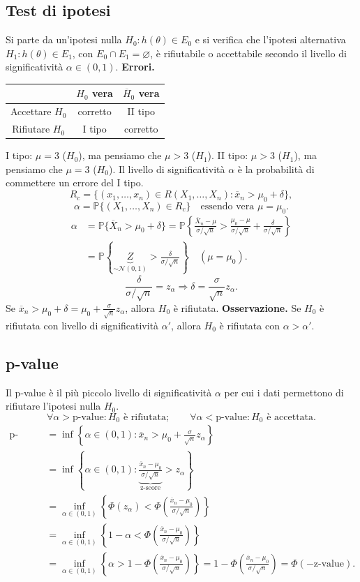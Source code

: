 \subsection*{Test di ipotesi}
Si parte da un'ipotesi nulla $H_0:h(\theta)\in E_0$ e si verifica che l'ipotesi alternativa $H_1:h(\theta)\in E_1$, con $E_0\cap E_1=\varnothing$, è rifiutabile o accettabile secondo il livello di significatività $\alpha\in(0,1)$.
\textbf{Errori.}
\begin{center}\begin{tabular}{c|cc}&$H_0$ vera&$\overline H_0$ vera\\\hline
Accettare $H_0$&corretto&II tipo\\Rifiutare $H_0$&I tipo&corretto\end{tabular}\end{center}
I tipo: $\mu=3$ ($H_0$), ma pensiamo che $\mu>3$ ($H_1$).
II tipo: $\mu>3$ ($H_1$), ma pensiamo che $\mu=3$ ($H_0$).
Il livello di significatività $\alpha$ è la probabilità di commettere un errore del I tipo.
\[\boxed{R_c=\{(x_1,\ldots,x_n)\in R(X_1,\ldots,X_n):\overline x_n>\mu_0+\delta\}},\]
\[\boxed{\alpha=\mathbb P\{(X_1,\ldots,X_n)\in R_c\}}\quad\text{essendo vera }\mu=\mu_0.\]
\begin{align*}
\alpha&=\mathbb P\{\overline X_n>\mu_0+\delta\}
=\mathbb P\left\{\frac{\overline X_n-\mu}{\sigma/\sqrt n}>\frac{\mu_0-\mu}{\sigma/\sqrt n}+\frac\delta{\sigma/\sqrt n}\right\}\\
&=\mathbb P\left\{\underbrace{Z}_{\sim\mathcal N(0,1)}>\frac\delta{\sigma/\sqrt n}\right\}\quad(\mu=\mu_0).
\end{align*}
\[\frac\delta{\sigma/\sqrt n}=z_\alpha\Rightarrow\delta=\frac\sigma{\sqrt n}z_\alpha.\]
Se $\overline x_n>\mu_0+\delta=\mu_0+\frac\sigma{\sqrt n}z_\alpha$, allora $H_0$ è rifiutata.
\textbf{Osservazione.} Se $H_0$ è rifiutata con livello di significatività $\alpha'$, allora $H_0$ è rifiutata con $\alpha>\alpha'$.
\subsection*{p-value}
Il p-value è il più piccolo livello di significatività $\alpha$ per cui i dati permettono di rifiutare l'ipotesi nulla $H_0$.
\[\forall\alpha>\text{p-value}:H_0\text{ è rifiutata};\qquad\forall\alpha<\text{p-value}:H_0\text{ è accettata}.\]
\begin{align*}
\text{p-value}&=\inf\left\{\alpha\in(0,1):\overline x_n>\mu_0+\frac\sigma{\sqrt n}z_\alpha\right\}\\
&=\inf\left\{\alpha\in(0,1):\underbrace{\frac{\overline x_n-\mu_0}{\sigma/\sqrt n}}_{\text{z-score}}>z_\alpha\right\}\\
&=\inf_{\alpha\in(0,1)}\left\{\Phi(z_\alpha)<\Phi\left(\frac{\overline x_n-\mu_0}{\sigma/\sqrt n}\right)\right\}\\
&=\inf_{\alpha\in(0,1)}\left\{1-\alpha<\Phi\left(\frac{\overline x_n-\mu_0}{\sigma/\sqrt n}\right)\right\}\\
&=\inf_{\alpha\in(0,1)}\left\{\alpha>1-\Phi\left(\frac{\overline x_n-\mu_0}{\sigma/\sqrt n}\right)\right\}
=1-\Phi\left(\frac{\overline x_n-\mu_0}{\sigma/\sqrt n}\right)=\Phi(-\text{z-value}).
\end{align*}
